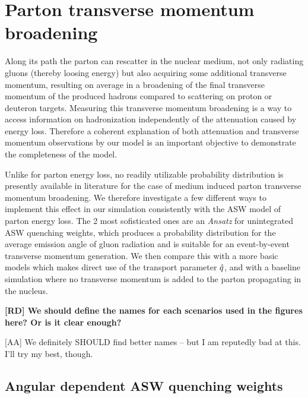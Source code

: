 \section{Parton transverse momentum broadening}
\label{sec:ptbroad}

Along its path the parton can rescatter in the nuclear medium, not only radiating gluons (thereby loosing energy) but also acquiring some additional transverse momentum, resulting on average in a broadening of the final transverse momentum of the produced hadrons compared to scattering on proton or deuteron targets. Measuring this transverse momentum broadening  
is a way to access information on hadronization independently of the 
attenuation caused by energy loss. Therefore a coherent explanation of both attenuation and transverse momentum observations by our model is an important objective to demonstrate the completeness of the model.
 
Unlike for parton energy loss, no readily utilizable probability distribution is presently available in literature for the case of medium induced parton transverse momentum broadening. We therefore investigate a few different ways to implement this effect in our simulation consistently with the ASW model of parton energy loss. The 2 most sofisticated ones are an {\it Ansatz} for unintegrated ASW quenching weights, which produces a probability distribution for the average emission angle of gluon radiation and is suitable for an event-by-event transverse momentum generation. We then compare this with a more basic models which makes direct use of the transport parameter ${\hat q}$, and with a baseline simulation where no transverse momentum is added to the parton propagating in the nucleus.  

{\bf 
[RD] We should define the names for each scenarios used in the figures here? Or is it clear enough?

[AA] We definitely SHOULD find better names -- but I am reputedly bad at this. I'll try my best, though.
}

\subsection{Angular dependent ASW quenching weights}
\label{sec:angular_quenching}

